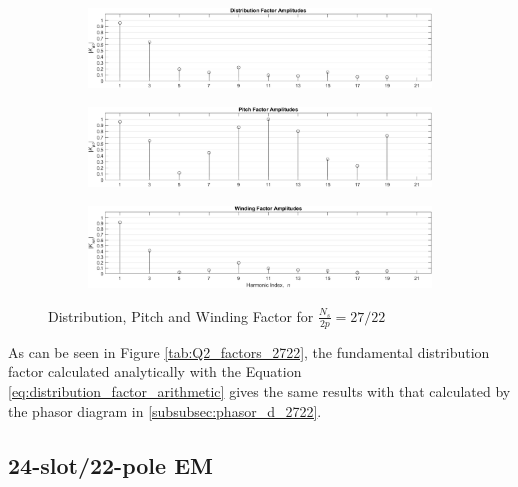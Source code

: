 \documentclass[a4paper, 11pt]{article}
\begin{document}
\begin{figure}[h!]
    \centering
    \begin{subfigure}[b]{1.00\textwidth}
        \includegraphics[width=\textwidth]{Q2_2722_distributionFactor.png}
        \caption{}
        \label{subfig:Q2_dist_factor_2722}
    \end{subfigure}
    \begin{subfigure}[b]{1.00\textwidth}
        \includegraphics[width=\textwidth]{Q2_2722_pitchFactor.png}
        \caption{}
        \label{subfig:Q2_pitch_factor_2722}
    \end{subfigure}
    \begin{subfigure}[b]{1.00\textwidth}
        \includegraphics[width=\textwidth]{Q2_2722_windingFactor.png}
        \caption{}
        \label{subfig:Q2_wind_factor_2722}
    \end{subfigure}
    \caption{Distribution, Pitch and Winding Factor for $\frac{N_s}{2p}=27/22$}
    \label{fig:Q2_factors_2722}
\end{figure}

As can be seen in Figure \ref{tab:Q2_factors_2722}, the fundamental distribution factor calculated analytically with the Equation \ref{eq:distribution_factor_arithmetic} gives the same results with that calculated by the phasor diagram in \ref{subsubsec:phasor_d_2722}.





\subsection{24-slot/22-pole EM}
\end{document}
